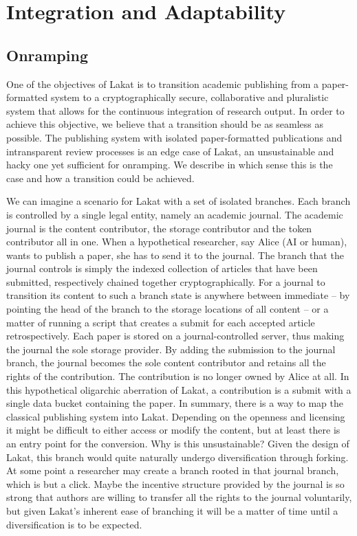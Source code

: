 

\section{Integration and Adaptability}
\label{sc:integrationadaptability}


\subsection{Onramping}
\label{ssc:onramping}

One of the objectives of Lakat is to transition academic publishing from a paper-formatted system to a cryptographically secure, collaborative and pluralistic system that allows for the continuous integration of research output. In order to achieve this objective, we believe that a transition should be as seamless as possible. The publishing system with isolated paper-formatted publications and intransparent review processes is an edge case of Lakat, an unsustainable and hacky one yet sufficient for onramping. We describe in which sense this is the case and how a transition could be achieved.

We can imagine a scenario for Lakat with a set of isolated branches. Each branch is controlled by a single legal entity, namely an academic journal. The academic journal is the content contributor, the storage contributor and the token contributor all in one. When a hypothetical researcher, say Alice (AI or human), wants to publish a paper, she has to send it to the journal. The branch that the journal  controls is simply the indexed collection of articles that have been submitted, respectively chained together cryptographically. For a journal to transition its content to such a branch state is anywhere between immediate -- by pointing the head of the branch to the storage locations of all content -- or a matter of running a script that creates a submit for each accepted article retrospectively.  Each paper is stored on a journal-controlled server, thus making the journal the sole storage provider. By adding the submission to the journal branch, the journal becomes the sole content contributor and retains all the rights of the contribution. The contribution is no longer owned by Alice at all. In this hypothetical oligarchic aberration of Lakat, a contribution is a submit with a single data bucket containing the paper. In summary, there is a way to map the classical publishing system into Lakat. Depending on the openness and licensing it might be difficult to either access or modify the content, but at least there is an entry point for the conversion.
Why is this unsustainable?  Given the design of Lakat, this branch would quite naturally undergo diversification through forking. At some point a researcher may create a branch rooted in that journal branch, which is but a click. Maybe the incentive structure provided by the journal is so strong that authors are willing to transfer all the rights to the journal voluntarily, but given Lakat's inherent ease of branching it will be a matter of time until a diversification is to be expected.



